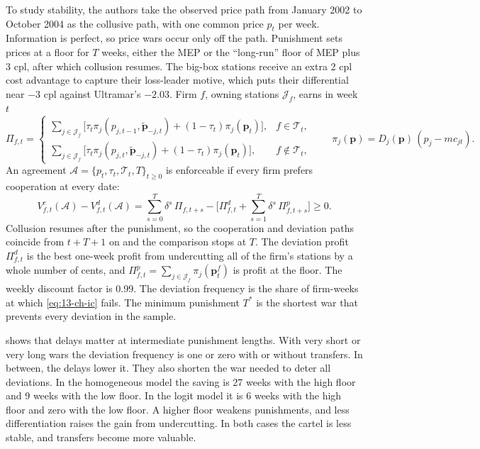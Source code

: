 To study stability, the authors take the observed price path from January 2002 to October 2004 as the collusive path, with one
common price $p_t$ per week. Information is perfect, so price wars occur only off the path. Punishment sets prices at a floor for
$T$ weeks, either the MEP or the ``long-run'' floor of MEP plus 3 cpl, after which collusion resumes. The big-box stations receive
an extra 2 cpl cost advantage to capture their loss-leader motive, which puts their differential near $-3$ cpl against Ultramar's
$-2.03$. Firm $f$, owning stations $\mathcal J_f$, earns in week $t$
\begin{equation*}
\Pi_{f,t}=\begin{cases}\sum_{j\in\mathcal J_f}\big[\tau_t\pi_j(p_{j,t-1},\tilde{\mathbf p}_{-j,t})+(1-\tau_t)\pi_j(\mathbf p_t)\big], & f\in\mathcal T_t,\\
\sum_{j\in\mathcal J_f}\big[\tau_t\pi_j(p_{j,t},\tilde{\mathbf p}_{-j,t})+(1-\tau_t)\pi_j(\mathbf p_t)\big], & f\notin\mathcal T_t,\end{cases}
\qquad \pi_j(\mathbf p)=D_j(\mathbf p)\,(p_j-mc_{jt}).
\end{equation*}
An agreement $\mathcal A=\{p_t,\tau_t,\mathcal T_t,T\}_{t\ge0}$ is enforceable if every firm prefers cooperation at every date:
\begin{equation}\label{eq:13-ch-ic}
V^{c}_{f,t}(\mathcal A)-V^{d}_{f,t}(\mathcal A)=\sum_{s=0}^{T}\delta^{s}\,\Pi_{f,t+s}-\Big[\Pi^{d}_{f,t}+\sum_{s=1}^{T}\delta^{s}\,\Pi^{p}_{f,t+s}\Big]\ge0 .
\end{equation}
Collusion resumes after the punishment, so the cooperation and deviation paths coincide from $t+T+1$ on and the comparison stops
at $T$. The deviation profit $\Pi^d_{f,t}$ is the best one-week profit from undercutting all of the firm's stations by a whole
number of cents, and $\Pi^p_{f,t}=\sum_{j\in\mathcal J_f}\pi_j(\mathbf p^f_t)$ is profit at the floor. The weekly discount factor is
0.99. The deviation frequency is the share of firm-weeks at which \eqref{eq:13-ch-ic} fails. The minimum punishment $T^*$ is the
shortest war that prevents every deviation in the sample.

 shows that delays matter at intermediate punishment lengths. With very short or very long wars the
deviation frequency is one or zero with or without transfers. In between, the delays lower it. They also shorten the war needed
to deter all deviations. In the homogeneous model the saving is 27 weeks with the high floor and 9 weeks with the low floor. In the
logit model it is 6 weeks with the high floor and zero with the low floor. A higher floor weakens punishments, and less
differentiation raises the gain from undercutting. In both cases the cartel is less stable, and transfers become more valuable.

